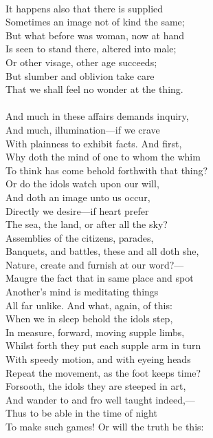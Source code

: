 \\
It happens also that there is supplied\\
Sometimes an image not of kind the same;\\
But what before was woman, now at hand\\
Is seen to stand there, altered into male;\\
Or other visage, other age succeeds;\\
But slumber and oblivion take care\\
That we shall feel no wonder at the thing.\\
\\
And much in these affairs demands inquiry,\\
And much, illumination—if we crave\\
With plainness to exhibit facts. And first,\\
Why doth the mind of one to whom the whim\\
To think has come behold forthwith that thing?\\
Or do the idols watch upon our will,\\
And doth an image unto us occur,\\
Directly we desire—if heart prefer\\
The sea, the land, or after all the sky?\\
Assemblies of the citizens, parades,\\
Banquets, and battles, these and all doth she,\\
Nature, create and furnish at our word?—\\
Maugre the fact that in same place and spot\\
Another's mind is meditating things\\
All far unlike. And what, again, of this:\\
When we in sleep behold the idols step,\\
In measure, forward, moving supple limbs,\\
Whilst forth they put each supple arm in turn\\
With speedy motion, and with eyeing heads\\
Repeat the movement, as the foot keeps time?\\
Forsooth, the idols they are steeped in art,\\
And wander to and fro well taught indeed,—\\
Thus to be able in the time of night\\
To make such games! Or will the truth be this:\\
